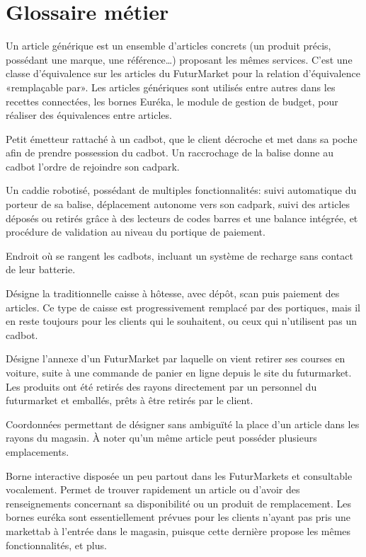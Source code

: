 \chapter{Glossaire métier}

Un article générique est un ensemble d'articles concrets (\cad un produit précis, possédant une marque, une référence\dots) proposant les mêmes services.
C'est une classe d'équivalence sur les articles du FuturMarket pour la relation d'équivalence «remplaçable par».\crlf
Les articles génériques sont utilisés entre autres dans les recettes connectées, les bornes Euréka, le module de gestion de budget, pour réaliser des équivalences entre articles.

Petit émetteur rattaché à un cadbot, que le client décroche et met dans sa poche afin de prendre possession du cadbot.
Un raccrochage de la balise donne au cadbot l'ordre de rejoindre son cadpark.

Un caddie robotisé, possédant de multiples fonctionnalités: suivi automatique du porteur de sa balise, déplacement autonome vers son cadpark, suivi des articles déposés ou retirés grâce à des lecteurs de codes barres et une balance intégrée, et procédure de validation au niveau du portique de paiement.

Endroit où se rangent les cadbots, incluant un système de recharge sans contact de leur batterie.

Désigne la traditionnelle caisse à hôtesse, avec dépôt, scan puis paiement des articles.
Ce type de caisse est progressivement remplacé par des portiques, mais il en reste toujours pour les clients qui le souhaitent, ou ceux qui n'utilisent pas un cadbot.

Désigne l'annexe d'un FuturMarket par laquelle on vient retirer ses courses en voiture, suite à une commande de panier en ligne depuis le site du futurmarket.
Les produits ont été retirés des rayons directement par un personnel du futurmarket et emballés, prêts à être retirés par le client.

Coordonnées permettant de désigner sans ambiguïté la place d'un article dans les rayons du magasin.
À noter qu'un même article peut posséder plusieurs emplacements.

Borne interactive disposée un peu partout dans les FuturMarkets et consultable vocalement.
Permet de trouver rapidement un article ou d'avoir des renseignements concernant sa disponibilité ou un produit de remplacement.
Les bornes euréka sont essentiellement prévues pour les clients n'ayant pas pris une markettab à l'entrée dans le magasin, puisque cette dernière propose les mêmes fonctionnalités, et plus.

